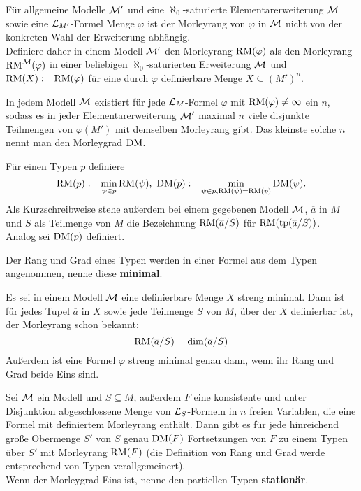 	\begin{fact}
		Für allgemeine Modelle $\mathcal{M}'$ und eine $\aleph_0$-saturierte Elementarerweiterung $\mathcal{M}$ sowie eine $\mathcal{L}_{M'}$-Formel Menge $\varphi$ ist der Morleyrang von $\varphi$ in $\mathcal{M}$ nicht von der konkreten Wahl der Erweiterung abhängig.\\
		Definiere daher in einem Modell $\mathcal{M}'$ den Morleyrang $\operatorname{RM}(\varphi)$ als den Morleyrang $\operatorname{RM}^{\mathcal{M}}(\varphi)$ in einer beliebigen $\aleph_0$-saturierten Erweiterung $\mathcal{M}$ und $\operatorname{RM}(X):=\operatorname{RM}(\varphi)$ für eine durch $\varphi$ definierbare Menge $X\subseteq(M')^n$.
	\end{fact}
	
	\begin{factdef}
		In jedem Modell $\mathcal{M}$ existiert für jede $\mathcal{L}_M$-Formel $\varphi$ mit $\operatorname{RM}(\varphi)\neq\infty$ ein $n$, sodass es in jeder Elementarerweiterung $\mathcal{M}'$ maximal $n$ viele disjunkte Teilmengen von $\varphi(M')$ mit demselben Morleyrang gibt. Das kleinste solche $n$ nennt man den Morleygrad $\operatorname{DM}$.
	\end{factdef}
	
	\begin{definition}
		Für einen Typen $p$ definiere $$\operatorname{RM}(p):=\min\limits_{\psi\in p}\operatorname{RM}(\psi),\ \operatorname{DM}(p):=\min\limits_{\psi\in p,\operatorname{RM}(\psi)=\operatorname{RM}(p)}\operatorname{DM}(\psi).$$
		Als Kurzschreibweise stehe außerdem bei einem gegebenen Modell $\mathcal{M}$, $\overline{a}$ in $M$ und $S$ als Teilmenge von $M$ die Bezeichnung $\operatorname{RM}(\overline{a}/S)$ für $\operatorname{RM}(\operatorname{tp}(\overline{a}/S))$.\\
		Analog sei $\operatorname{DM}(p)$ definiert.
	\end{definition}
	\begin{remark}
		Der Rang und Grad eines Typen werden in einer Formel aus dem Typen angenommen, nenne diese \textbf{minimal}.
	\end{remark}
	
	\begin{fact}
		Es sei in einem Modell $\mathcal{M}$ eine definierbare Menge $X$ streng minimal. Dann ist für jedes Tupel $\overline{a}$ in $X$ sowie jede Teilmenge $S$ von $M$, über der $X$ definierbar ist, der Morleyrang schon bekannt: $$\operatorname{RM}(\overline{a}/S)=\dim(\overline{a}/S)$$
		Außerdem ist eine Formel $\varphi$ streng minimal genau dann, wenn ihr Rang und Grad beide Eins sind.
	\end{fact}
	
	\begin{fact}
		Sei $\mathcal{M}$ ein Modell und $S\subseteq M$, außerdem $F$ eine konsistente und unter Disjunktion abgeschlossene Menge von $\mathcal{L}_S$-Formeln in $n$ freien Variablen, die eine Formel mit definiertem Morleyrang enthält. Dann gibt es für jede hinreichend große Obermenge $S'$ von $S$ genau $\operatorname{DM}(F)$ Fortsetzungen von $F$ zu einem Typen über $S'$ mit Morleyrang $\operatorname{RM}(F)$ (die Definition von Rang und Grad werde entsprechend von Typen verallgemeinert).\\
		Wenn der Morleygrad Eins ist, nenne den partiellen Typen \textbf{stationär}. 
	\end{fact}
	
